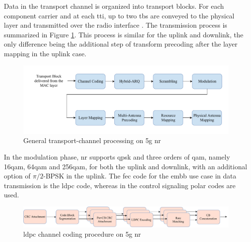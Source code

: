 Data in the transport channel is organized into transport blocks. For each component carrier and at each \gls{tti}, up to two \glspl{tb} are conveyed to the physical layer and transmitted over the radio interface  \cite{ErikDahlman5G}.
%
The transmission process is summarized in Figure \ref{fig:transmission}.
%
This process is similar for the uplink and downlink, the only difference being the additional step of transform precoding after the layer mapping in the uplink case.

\begin{figure}[htbp]
\includegraphics[width=\columnwidth]{figures/chp_theory/transmissionmodel.pdf}
\caption{General transport-channel processing on \gls{5g} \gls{nr}}
\label{fig:transmission}
\end{figure}
%
In the modulation phase, \gls{nr} supports \gls{qpsk} and three orders of \gls{qam}, namely 16\gls{qam}, 64\gls{qam} and 256\gls{qam}, for both the uplink and downlink, with an additional option of $\pi/2$-BPSK in the uplink.
%
The \gls{fec} code for the \gls{embb} use case in data transmission is the \gls{ldpc} code, whereas in the control signaling polar codes are used.
%

\begin{figure}[htbp]
\includegraphics[width=\columnwidth]{figures/chp_theory/channelcoding.pdf}
\caption{\gls{ldpc} channel coding procedure on \gls{5g} \gls{nr}}
\label{fig:channel-coding}
\end{figure}

